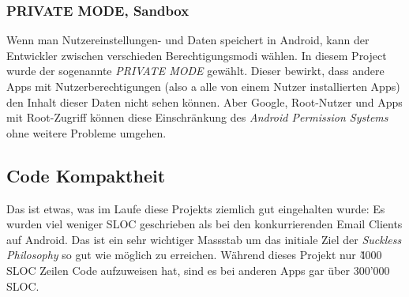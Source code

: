 \documentclass[a4paper,11pt]{article}
\begin{document}
\subsubsection{PRIVATE MODE, Sandbox}
Wenn man Nutzereinstellungen- und Daten speichert in Android, kann der Entwickler zwischen verschieden Berechtigungsmodi wählen. In diesem Project wurde der sogenannte \textit{PRIVATE MODE} gewählt. Dieser bewirkt, dass andere Apps mit Nutzerberechtigungen (also a alle von einem Nutzer installierten Apps) den Inhalt dieser Daten nicht sehen können. Aber Google, Root-Nutzer und Apps mit Root-Zugriff können diese Einschränkung des \textit{Android Permission Systems} ohne weitere Probleme umgehen.\\



\subsection{Code Kompaktheit}
Das ist etwas, was im Laufe diese Projekts ziemlich gut eingehalten wurde: Es wurden viel weniger SLOC geschrieben als bei den konkurrierenden Email Clients auf Android. Das ist ein sehr wichtiger Massstab um das initiale Ziel der \textit{Suckless Philosophy} so gut wie möglich zu erreichen. Während dieses Projekt nur \~ 4000 SLOC Zeilen Code aufzuweisen hat, sind es bei anderen Apps gar über 300'000 SLOC.
\end{document}
